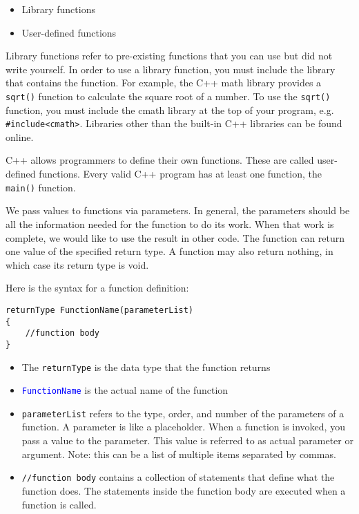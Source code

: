 \begin{itemize}
    \item Library functions
    \item User-defined functions
\end{itemize}

Library functions refer to pre-existing functions that you can use but did not write yourself. In order to use a library function, you must include the library that contains the function. For example, the C++ math library provides a \texttt{sqrt()} function to calculate the square root of a number. To use the \texttt{sqrt()} function, you must include the cmath library at the top of your program, e.g. \texttt{#include<cmath>}. Libraries other than the built-in C++ libraries can be found online.

C++ allows programmers to define their own functions. These are called user-defined functions. Every valid C++ program has at least one function, the \texttt{main()} function.

We pass values to functions via parameters. In general, the parameters should be all the information needed for the function to do its work. When that work is complete, we would like to use the result in other code. The function can return one value of the specified return type. A function may also return nothing, in which case its return type is void.

Here is the syntax for a function definition:

\begin{verbatim}
returnType FunctionName(parameterList)
{
    //function body
}
\end{verbatim}

\begin{itemize}
    \item The \texttt{returnType} is the data type that the function returns
    \item \textcolor{blue}{\texttt{FunctionName}} is the actual name of the function
    \item \texttt{parameterList} refers to the type, order, and number of the parameters of a function. A parameter is like a placeholder. When a function is invoked, you pass a value to the parameter. This value is referred to as actual parameter or argument. Note: this can be a list of multiple items separated by commas. 
    \item \texttt{//function body} contains a collection of statements that define what the function does. The statements inside the function body are executed when a function is called.
\end{itemize}

